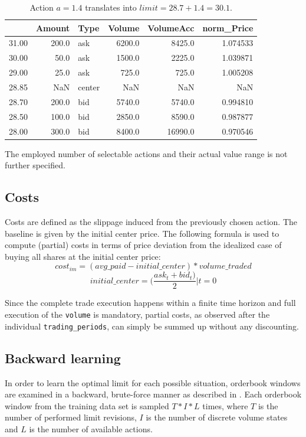 \begin{table}
\centering
\begin{tabular}{lrlrrr}
\toprule
{} &  Amount &    Type &  Volume &  VolumeAcc &  norm\_Price \\
\midrule
31.00 &   200.0 &     ask &  6200.0 &     8425.0 &    1.074533 \\
30.00 &    50.0 &     ask &  1500.0 &     2225.0 &    1.039871 \\
29.00 &    25.0 &     ask &   725.0 &      725.0 &    1.005208 \\
28.85 &     NaN &  center &     NaN &        NaN &         NaN \\
28.70 &   200.0 &     bid &  5740.0 &     5740.0 &    0.994810 \\
28.50 &   100.0 &     bid &  2850.0 &     8590.0 &    0.987877 \\
28.00 &   300.0 &     bid &  8400.0 &    16990.0 &    0.970546 \\
\bottomrule
\end{tabular}
\caption{Action $a=1.4$ translates into $limit=28.7 + 1.4 = 30.1$.}
\label{table:orderbook:example:again}
\end{table}

The employed number of selectable actions and their actual value range is not further specified.


\subsection{Costs}
\label{chap:costs}
Costs are defined as the slippage induced from the previously chosen action. The baseline is given by the initial center price. The following formula is used to compute (partial) costs in terms of price deviation from the idealized case of buying all shares at the initial center price:
\begin{equation}
\label{eq:imcost}
   cost_{im} = (avg\_paid - initial\_center) * volume\_traded
\end{equation}
\begin{equation}
   initial\_center = (\dfrac{ask_t+bid_t)}{2} | t=0
\end{equation}

Since the complete trade execution happens within a finite time horizon and full execution of the \lstinline!volume! is mandatory, partial costs, as observed after the individual \lstinline!trading_periods!, can simply be summed up without any discounting.


\subsection{Backward learning}
\label{chap:backwardlearning}
In order to learn the optimal limit for each possible situation, orderbook windows are examined in a backward, brute-force manner as described in . Each orderbook window from the training data set is sampled $T*I*L$ times, where $T$ is the number of performed limit revisions, $I$ is the number of discrete volume states and $L$ is the number of available actions.

